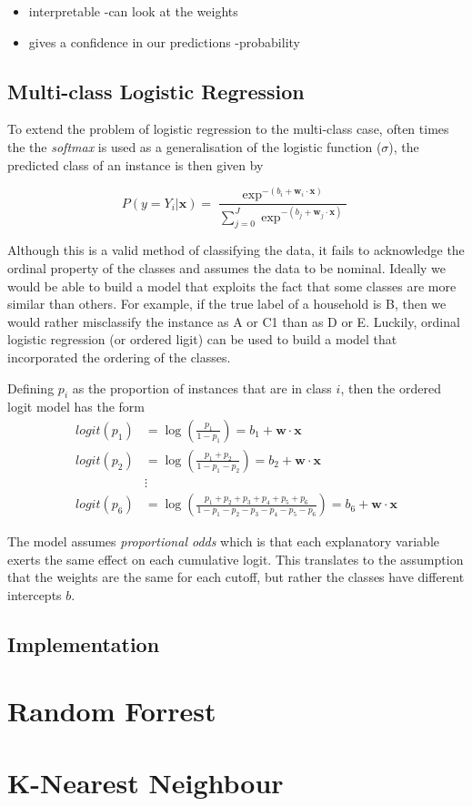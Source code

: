 \begin{itemize}
\item interpretable -can look at the weights
\item gives a confidence in our predictions -probability
\end{itemize}

\subsection{Multi-class Logistic Regression}

To extend the problem of logistic regression to the multi-class case, often times the the \textit{softmax} is used as a generalisation of the logistic function ($\sigma$), the predicted class of an instance is then given by

\[P(y=Y_i|\textbf{x})=\frac{\exp^{-(b_i+\textbf{w}_i\cdot{\textbf{x}})}}{\sum_{j=0}^J\exp^{-(b_j+\textbf{w}_j\cdot{\textbf{x}})}}\]

Although this is a valid method of classifying the data, it fails to acknowledge the ordinal property of the classes and assumes the data to be nominal. Ideally we would be able to build a model that exploits the fact that some classes are more similar than others. For example, if the true label of a household is B, then we would rather misclassify the instance as A or C1 than as D or E. Luckily, ordinal logistic regression (or ordered ligit) can be used to build a model that incorporated the ordering of the classes.

Defining $p_i$ as the proportion of instances that are in class $i$, then the ordered logit model has the form
\begin{align*}
logit(p_1) &=\log(\frac{p_1}{1-p_1}) = b_1 +\textbf{w}\cdot{\textbf{x}} \\
logit(p_2) &=\log(\frac{p_1+p_2}{1-p_1-p_2}) = b_2 +\textbf{w}\cdot{\textbf{x}}\\
&\vdots \\
logit(p_6) &=\log(\frac{p_1+p_2+p_3+p_4+p_5+p_6}{1-p_1-p_2-p_3-p_4-p_5-p_6}) = b_6 +\textbf{w}\cdot{\textbf{x}}
\end{align*}

The model assumes \textit{proportional odds} which is that each explanatory variable exerts the same effect on each cumulative logit. This translates to the assumption that the weights are the same for each cutoff, but rather the classes have different intercepts $b$.
\subsection{Implementation}

\section{Random Forrest}


\section{K-Nearest Neighbour}


